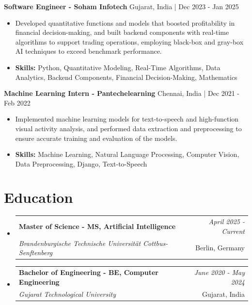 \documentclass[a4paper,11pt]{article}
\makeatletter
\newcommand{\resumeSubheading}[4]{
\vspace{0.5mm}\item
    \begin{tabular*}{0.98\textwidth}[t]{l@{\extracolsep{\fill}}r}
        \textbf{#1} & \textit{\footnotesize{#4}} \\
        \textit{\footnotesize{#3}} &  \footnotesize{#2}\\
    \end{tabular*}
    \vspace{-2.4mm}
}
\makeatother
\begin{document}
\vspace{1mm}
  \textbf{Software Engineer - Soham Infotech} \hfill Gujarat, India | Dec 2023 - Jan 2025
\vspace{-1.5mm} %
\begin{itemize}
  \item Developed quantitative functions and models that boosted profitability in financial decision-making, and built backend components with real-time algorithms to support trading operations, employing black-box and gray-box AI techniques to exceed benchmark performance.

\vspace{-2mm}
  \item \textbf{Skills:} Python, Quantitative Modeling, Real-Time Algorithms, Data Analytics, Backend Components, Financial Decision-Making, Mathematics
\end{itemize}

\vspace{1mm}
  \textbf{Machine Learning Intern - Pantechelearning} \hfill Chennai, India | Dec 2021 - Feb 2022
\vspace{-1.5mm} %
\begin{itemize}
  \item Implemented machine learning models for text-to-speech and high-function visual activity analysis, and performed data extraction and preprocessing to ensure accurate training and evaluation of the models.
\vspace{-2mm}
  \item \textbf{Skills:} Machine Learning, Natural Language Processing, Computer Vision, Data Preprocessing, Django, Text-to-Speech
\end{itemize}\section{\textbf{Education}}
\vspace{-0.4mm}

\begin{itemize}
\resumeSubheading
{Master of Science - MS, Artificial Intelligence }{Berlin, Germany}
{Brandenburgische Technische Universität Cottbus-Senftenberg  }{April 2025 - Current}

\vspace{1.0mm} %
\resumeSubheading
{Bachelor of Engineering - BE, Computer Engineering  }{Gujarat, India}
{Gujarat Technological University }{June 2020 - May 2024}

\end{itemize}
\end{document}

